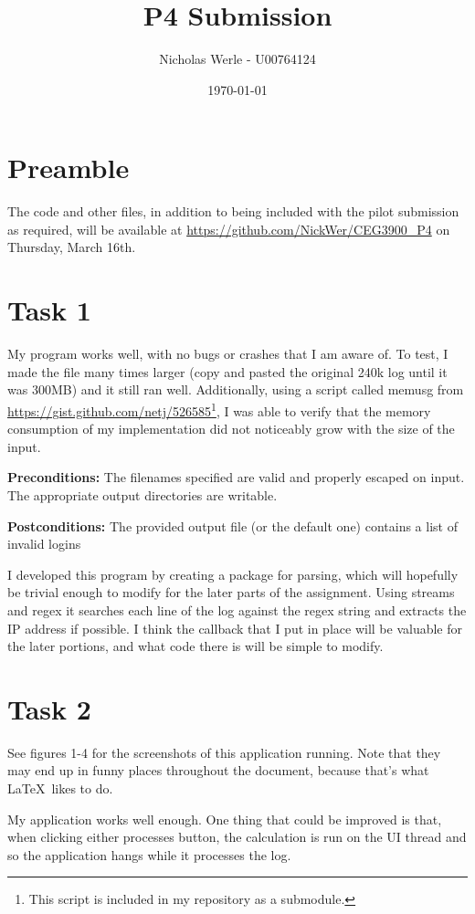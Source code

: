 \documentclass[11pt]{article}
\title{P4 Submission}
\author{Nicholas Werle - U00764124}
\date{\today}
\begin{document}
	\maketitle
	\section{Preamble}
	The code and other files, in addition to being included with the pilot submission as required, will be available at \url{https://github.com/NickWer/CEG3900_P4} on Thursday, March 16th.
	\section{Task 1}
	My program works well, with no bugs or crashes that I am aware of. To test, I made the file many times larger (copy and pasted the original 240k log until it was 300MB) and it still ran well. Additionally, using a script called memusg from \url{https://gist.github.com/netj/526585}\footnote{This script is included in my repository as a submodule.}, I was able to verify that the memory consumption of my implementation did not noticeably grow with the size of the input.
	
	\textbf{Preconditions:} The filenames specified are valid and properly escaped on input. The appropriate output directories are writable.
	
	\textbf{Postconditions:} The provided output file (or the default one) contains a list of invalid logins
	
	I developed this program by creating a package for parsing, which will hopefully be trivial enough to modify for the later parts of the assignment. Using streams and regex it searches each line of the log against the regex string and extracts the IP address if possible. I think the callback that I put in place will be valuable for the later portions, and what code there is will be simple to modify.
	\section{Task 2}
	See figures 1-4 for the screenshots of this application running. Note that they may end up in funny places throughout the document, because that's what \LaTeX\ likes to do.
	
	My application works well enough. One thing that could be improved is that, when clicking either processes button, the calculation is run on the UI thread and so the application hangs while it processes the log.
	
\end{document}
